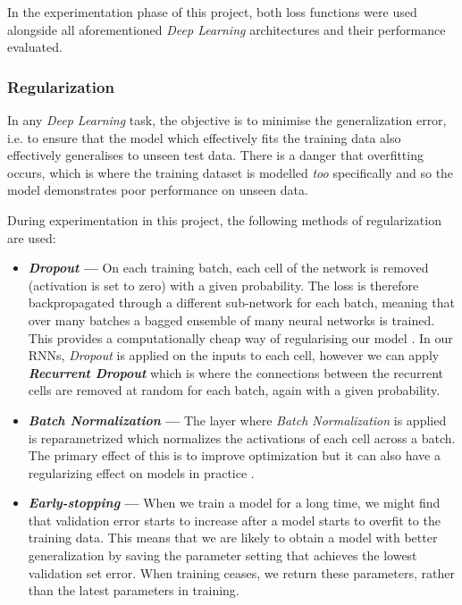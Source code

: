 \documentclass[12pt,a4paper]{article}
\begin{document}
	In the experimentation phase of this project, both loss functions were used alongside all aforementioned \textit{Deep Learning} architectures and their performance evaluated.
	
	\subsubsection{Regularization}
	In any \textit{Deep Learning} task, the objective is to minimise the generalization error, i.e. to ensure that the model which effectively fits the training data also effectively generalises to unseen test data. There is a danger that overfitting occurs, which is where the training dataset is modelled \textit{too} specifically and so the model demonstrates poor performance on unseen data. 
	
	During experimentation in this project, the following methods of regularization are used:
	\begin{itemize}
		\item \textbf{\textit{Dropout} --- }On each training batch, each cell of the network is removed (activation is set to zero) with a given probability. The loss is therefore backpropagated through a different sub-network for each batch, meaning that over many batches a bagged ensemble of many neural networks is trained. This provides a computationally cheap way of regularising our model \cite[p.273]{DL}. In our RNNs, \textit{Dropout} is applied on the inputs to each cell, however we can apply \textbf{\textit{Recurrent Dropout}} which is where the connections between the recurrent cells are removed at random for each batch, again with a given probability.
		\item \textbf{\textit{Batch Normalization} --- }The layer where \textit{Batch Normalization} is applied is reparametrized which normalizes the activations of each cell across a batch. The primary effect of this is to improve optimization but it can also have a regularizing effect on models in practice \cite[p.1]{Sergey}. 
		\item \textbf{\textit{Early-stopping} --- }When we train a model for a long time, we might find that validation error starts to increase after a model starts to overfit to the training data. This means that we are likely to obtain a model with better generalization by saving the parameter setting that achieves the lowest validation set error. When training ceases, we return these parameters, rather than the latest parameters in training.
	\end{itemize}
\end{document}

